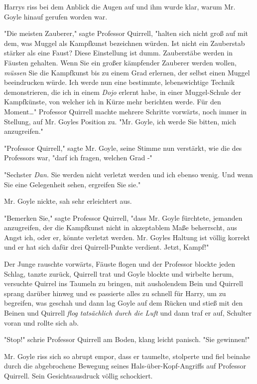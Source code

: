 {Harrys riss bei dem Anblick die Augen auf und ihm wurde klar, warum Mr. Goyle hinauf gerufen worden war.

"Die meisten Zauberer," sagte Professor Quirrell, "halten sich nicht groß auf mit dem, was Muggel als Kampfkunst bezeichnen würden. Ist nicht ein Zauberstab stärker als eine Faust? Diese Einstellung ist dumm. Zauberstäbe werden in Fäusten gehalten. Wenn Sie ein großer kämpfender Zauberer werden wollen, \emph{müssen} Sie die Kampfkunst bis zu einem Grad erlernen, der selbst einen Muggel beeindrucken würde. Ich werde nun eine bestimmte, lebenswichtige Technik demonstrieren, die ich in einem \emph{Dojo} erlernt habe, in einer Muggel-Schule der Kampfkünste, von welcher ich in Kürze mehr berichten werde. Für den Moment…" Professor Quirrell machte mehrere Schritte vorwärts, noch immer in Stellung, auf Mr. Goyles Position zu. "Mr. Goyle, ich werde Sie bitten, mich anzugreifen."

"Professor Quirrell," sagte Mr. Goyle, seine Stimme nun verstärkt, wie die des Professors war, "darf ich fragen, welchen Grad -"

"Sechster \emph{Dan.} Sie werden nicht verletzt werden und ich ebenso wenig. Und wenn Sie eine Gelegenheit sehen, ergreifen Sie sie."

Mr. Goyle nickte, sah sehr erleichtert aus.

"Bemerken Sie," sagte Professor Quirrell, "dass Mr. Goyle fürchtete, jemanden anzugreifen, der die Kampfkunst nicht in akzeptablem Maße beherrscht, aus Angst ich, oder er, könnte verletzt werden. Mr. Goyles Haltung ist völlig korrekt und er hat sich dafür drei Quirrell-Punkte verdient. Jetzt, Kampf!"

Der Junge rauschte vorwärts, Fäuste flogen und der Professor blockte jeden Schlag, tanzte zurück, Quirrell trat und Goyle blockte und wirbelte herum, versuchte Quirrel ins Taumeln zu bringen, mit ausholendem Bein und Quirrell sprang darüber hinweg und es passierte alles zu schnell für Harry, um zu begreifen, was geschah und dann lag Goyle auf dem Rücken und stieß mit den Beinen und Quirrell \emph{flog tatsächlich durch die Luft} und dann traf er auf, Schulter voran und rollte sich ab.

"Stop!" schrie Professor Quirrell am Boden, klang leicht panisch. "Sie gewinnen!"

Mr. Goyle riss sich so abrupt empor, dass er taumelte, stolperte und fiel beinahe durch die abgebrochene Bewegung seines Hals-über-Kopf-Angriffs auf Professor Quirrell. Sein Gesichtsausdruck völlig schockiert.

}
